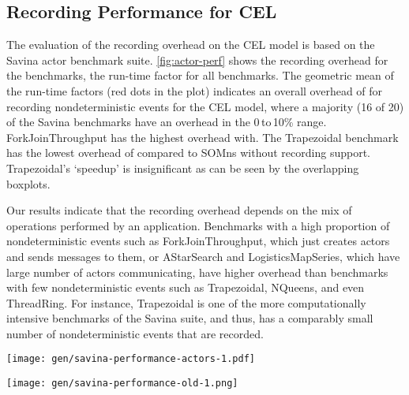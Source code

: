 \documentclass[a4paper,UKenglish,cleveref,autoref]{lipics-v2019}
\def\SOMns{SOM{\sc ns}\xspace}
\begin{document}
\subsection{Recording Performance for CEL}
\label{sec:evalActors}

The evaluation of the recording overhead on the CEL model is based on the Savina actor benchmark suite.
\cref{fig:actor-perf} shows the recording overhead for the benchmarks, \ie the run-time factor for all benchmarks.
%
The geometric mean of the run-time factors (red dots in the plot)
indicates an overall overhead of\SavinaAvgOverheadP
for recording nondeterministic events for the CEL model,
where a majority (16 of 20) of the Savina benchmarks
have an overhead
in the 0\,to\,10\% range.
%
ForkJoinThroughput has the highest overhead with\SavinaMaxOverheadP.
The Trapezoidal benchmark has the lowest overhead
of\SavinaMinOverheadP
compared to \SOMns without recording support.
%
Trapezoidal's `speedup' is insignificant as can be seen by the overlapping boxplots.

Our results indicate that
the recording overhead
depends on the mix of operations performed by an application.
Benchmarks with a high proportion of nondeterministic events
such as ForkJoinThroughput,
which just creates actors and sends messages to them,
or AStarSearch and LogisticsMapSeries,
which have large number of actors communicating,
have higher overhead than benchmarks with few nondeterministic events
such as Trapezoidal, NQueens, and even ThreadRing.
For instance, Trapezoidal is one of the more computationally intensive
benchmarks of the Savina suite,
and thus, has a comparably small number of nondeterministic events that are recorded.


\begin{figure*}
	\begin{minipage}{.475\textwidth}
    \texttt{[image: gen/savina-performance-actors-1.pdf]}
		\caption{
      Recording performance of uniform record \& replay for CEL actors
      compared to regular benchmark executions.
      The average overhead is\SavinaAvgOverheadP (min.\SavinaMinOverheadP, max.\SavinaMaxOverheadP) and thus,
      in an acceptable range for many production applications.
      \vspace{2\baselineskip}}
		\label{fig:actor-perf}
	\end{minipage}
	\hspace{0.05\textwidth}
	\begin{minipage}{.475\textwidth}
    \texttt{[image: gen/savina-performance-old-1.png]}
		\caption{
      Comparison of the recording performance of our uniform record \& replay
      with a solution optimized for actors only,
      both to the baseline of \SOMns without any recording.
      The actors-specific record \& replay
      has an average overhead of\SavinaOldAvgOverheadP
      (min.\SavinaOldMinOverheadP, max.\SavinaOldMaxOverheadP).
      This means our uniform solution is
      competitive with the optimized actors-specific solutions.}
		\label{fig:actor-perf-comp}
	\end{minipage}
\end{figure*}
\end{document}
